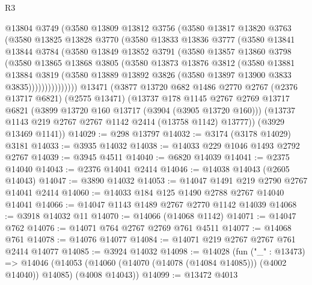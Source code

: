 \begin{lexlean}{R3}
\begin{coremodule}
          @13804
          @3749
          (@3580
            @13809
            @13812
            @3756
            (@3580
              @13817
              @13820
              @3763
              (@3580
                @13825
                @13828
                @3770
                (@3580
                  @13833
                  @13836
                  @3777
                  (@3580
                    @13841
                    @13844
                    @3784
                    (@3580
                      @13849
                      @13852
                      @3791
                      (@3580
                        @13857
                        @13860
                        @3798
                        (@3580
                          @13865
                          @13868
                          @3805
                          (@3580
                            @13873
                            @13876
                            @3812
                            (@3580
                              @13881
                              @13884
                              @3819
                              (@3580
                                @13889
                                @13892
                                @3826
                                (@3580 @13897 @13900 @3833 @3835)))))))))))))))
    @13471
    (@3877
      @13720
      @682
      @1486
      @2770
      @2767
      (@2376 @13717 @6821)
      (@2575 @13471)
      (@13737
        @178
        @1145
        @2767
        @2769
        @13717
        @6821
        (@3899 @13720 @160 @13717 (@3904 (@3905 @13720 @160)))
        (@13737 @1143 @219 @2767 @2767 @1142 @2414 (@13758 @1142) @13777))
      (@3929 @13469 @1141))
@14029 := @298 @13797
@14032 := @3174 (@3178 @14029) @3181
@14033 := @3935 @14032
@14038 := @14033 @229 @1046 @1493 @2792 @2767
@14039 := @3945 @4511
@14040 := @6820 @14039
@14041 := @2375 @14040
@14043 := @2376 @14041 @2414
@14046 := @14038 @14043 (@2605 @14043)
@14047 := @3890 @14032
@14053 := @14047 @1491 @219 @2790 @2767 @14041 @2414
@14060 := @14033 @184 @125 @1490 @2788 @2767 @14040 @14041
@14066 := @14047 @1143 @1489 @2767 @2770 @1142 @14039
@14068 := @3918 @14032 @11
@14070 := @14066 (@14068 @1142)
@14071 := @14047 @762
@14076 := @14071 @764 @2767 @2769 @761 @4511
@14077 := @14068 @761
@14078 := @14076 @14077
@14084 := @14071 @219 @2767 @2767 @761 @2414 @14077
@14085 := @3924 @14032
@14098 := @14028
    (fun ("_" : @13473) =>
    @14046 (@14053 (@14060 (@14070 (@14078 (@14084 @14085))) (@4002 @14040)) @14085) (@4008 @14043))
@14099 := @13472 @4013

\end{coremodule}
\end{lexlean}
